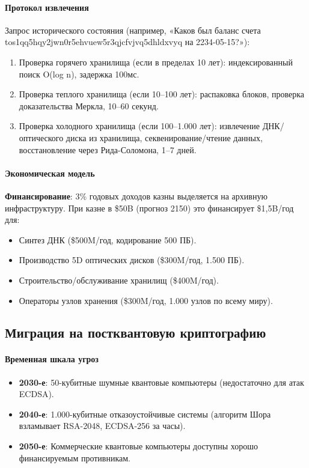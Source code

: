 \documentclass[11pt]{article}
\begin{document}
\paragraph{Протокол извлечения}
Запрос исторического состояния (например, «Каков был баланс счета tos1qq5hqy2jwn0r5ehvuew5r3qjcfvjvq5dhldxvyq на 2234-05-15?»):
\begin{enumerate}[noitemsep]
  \item Проверка горячего хранилища (если в пределах 10 лет): индексированный поиск O(log n), задержка 100мс.
  \item Проверка теплого хранилища (если 10--100 лет): распаковка блоков, проверка доказательства Меркла, 10--60 секунд.
  \item Проверка холодного хранилища (если 100--1.000 лет): извлечение ДНК/оптического диска из хранилища, секвенирование/чтение данных, восстановление через Рида-Соломона, 1--7 дней.
\end{enumerate}

\paragraph{Экономическая модель}
\textbf{Финансирование}: 3\% годовых доходов казны выделяется на архивную инфраструктуру. При казне в \$50B (прогноз 2150) это финансирует \$1,5B/год для:
\begin{itemize}[noitemsep]
  \item Синтез ДНК (\$500M/год, кодирование 500 ПБ).
  \item Производство 5D оптических дисков (\$300M/год, 1.500 ПБ).
  \item Строительство/обслуживание хранилищ (\$400M/год).
  \item Операторы узлов хранения (\$300M/год, 1.000 узлов по всему миру).
\end{itemize}

\subsection{Миграция на постквантовую криптографию}

\paragraph{Временная шкала угроз}
\begin{itemize}[noitemsep]
  \item \textbf{2030-е}: 50-кубитные шумные квантовые компьютеры (недостаточно для атак ECDSA).
  \item \textbf{2040-е}: 1.000-кубитные отказоустойчивые системы (алгоритм Шора взламывает RSA-2048, ECDSA-256 за часы).
  \item \textbf{2050-е}: Коммерческие квантовые компьютеры доступны хорошо финансируемым противникам.
\end{itemize}
\end{document}
